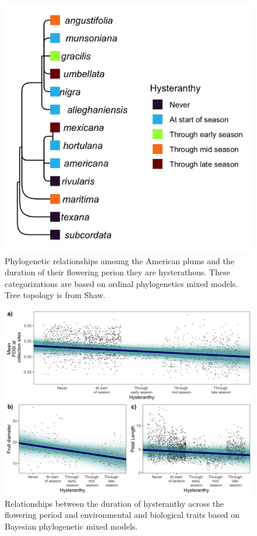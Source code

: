 \documentclass{article}[11pt]
\begin{document}
\begin{figure}[h!]
    \centering
 \includegraphics[width=.6\textwidth]{..//..//Plots/phylosig2.jpeg}
    \caption{Phylogenetic relationships amoung the American plums and the duration of their flowering perion they are hysterathous. These categorizations are based on ordinal phylogenetics mixed models. Tree topology is from Shaw.}
    \label{fig:phylo2}
\end{figure}


\begin{figure}[h!]
    \centering
 \includegraphics[width=\textwidth]{..//..//Plots/dataplots.jpeg}
    \caption{Relationships between the duration of hysteranthy across the flowering period and environmental and biological traits based on Bayesian phylogenetic mixed models.}
    \label{fig:prunes}
\end{figure}


\end{document}
